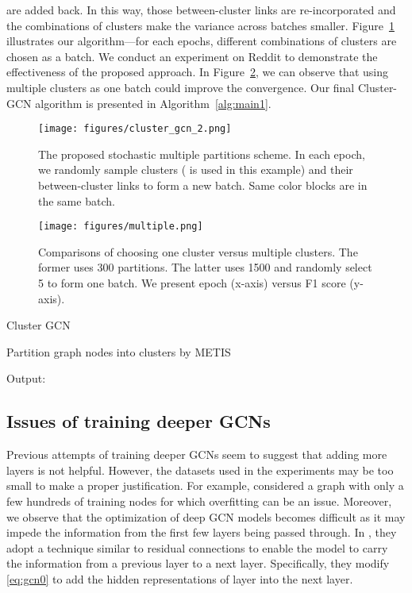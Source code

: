 \documentclass[sigconf]{acmart}
\begin{document}
are added back.
In this way, those between-cluster links are re-incorporated and the combinations of clusters make the variance across batches smaller.
Figure~\ref{fig:cluster2} illustrates our algorithm---for each epochs, different combinations of clusters are chosen as a batch. 
We conduct an experiment on Reddit to demonstrate the effectiveness of the proposed approach.
In Figure~\ref{fig:multiple}, we can observe that using multiple clusters as one batch could improve the convergence.
Our final Cluster-GCN algorithm is presented in Algorithm~\ref{alg:main1}.


\begin{figure}
 \centering 
    \texttt{[image: figures/cluster\_gcn\_2.png]}
    \caption{The proposed stochastic multiple partitions scheme. In each epoch, we randomly sample  clusters ( is used in this example) and their between-cluster links to form a new batch. Same color blocks are in the same batch. }
    \label{fig:cluster2}
    \vspace{-10pt}
\end{figure}

\begin{figure}
 \centering 
    \texttt{[image: figures/multiple.png]}
    \caption{Comparisons of choosing one cluster versus multiple clusters. The former uses 300 partitions. The latter uses 1500 and randomly select 5 to form one batch. We present epoch (x-axis) versus F1 score (y-axis).}
    \label{fig:multiple}
    \vspace{-10pt}
\end{figure}



\begin{algorithm}[t]
\label{alg:main1}
\caption{Cluster GCN}
 \label{alg:main1}
Partition graph nodes into  clusters  by METIS\;

Output: 
\end{algorithm} 

\subsection{Issues of training deeper GCNs}

Previous attempts of training deeper GCNs \cite{kipf2017semi} seem to suggest that adding more layers is not helpful. However, the datasets used in the experiments may be too small to make a proper justification.
For example, \cite{kipf2017semi} considered a graph with only a few hundreds of training nodes for which overfitting can be an issue.
Moreover, we observe that the optimization of deep GCN models becomes difficult as it may impede the information from the first few layers being passed through.
In \cite{kipf2017semi}, they adopt a technique similar to residual connections \cite{he2016deep} to enable the model to carry the information from a previous layer to a next layer.
Specifically, they modify \eqref{eq:gcn0} to add the hidden representations of layer  into the next layer.
\end{document}
